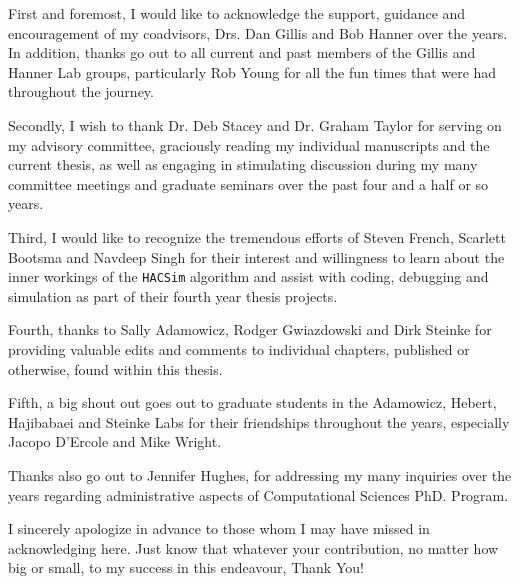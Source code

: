 \begin{acknowledgements}\label{acknow}
\ssp

\noindent First and foremost, I would like to acknowledge the support, guidance and encouragement of my coadvisors, Drs. Dan Gillis and Bob Hanner over the years. In addition, thanks go out to all current and past members of the Gillis and Hanner Lab groups, particularly Rob Young for all the fun times that were had throughout the journey.

\vspace{5mm}

\noindent Secondly, I wish to thank Dr. Deb Stacey and Dr. Graham Taylor for serving on my advisory committee, graciously reading my individual manuscripts and the current thesis, as well as engaging in stimulating discussion during my many committee meetings and graduate seminars over the past four and a half or so years.

\vspace{5mm}

\noindent Third, I would like to recognize the tremendous efforts of Steven French, Scarlett Bootsma and Navdeep Singh for their interest and willingness to learn about the inner workings of the {\tt HACSim} algorithm and assist with coding, debugging and simulation as part of their fourth year thesis projects.

\vspace{5mm}

\noindent Fourth, thanks to Sally Adamowicz, Rodger Gwiazdowski and Dirk Steinke for providing valuable edits and comments to individual chapters, published or otherwise, found within this thesis.

\vspace{5mm}

\noindent Fifth, a big shout out goes out to graduate students in the Adamowicz, Hebert, Hajibabaei and Steinke Labs for their friendships throughout the years, especially Jacopo D'Ercole and Mike Wright.

\vspace{5mm}

\noindent Thanks also go out to Jennifer Hughes, for addressing my many inquiries over the years regarding administrative aspects of Computational Sciences PhD. Program.

\vspace{5mm}

\noindent I sincerely apologize in advance to those whom I may have missed in acknowledging here. Just know that whatever your contribution, no matter how big or small, to my success in this endeavour, Thank You!


\end{acknowledgements}
